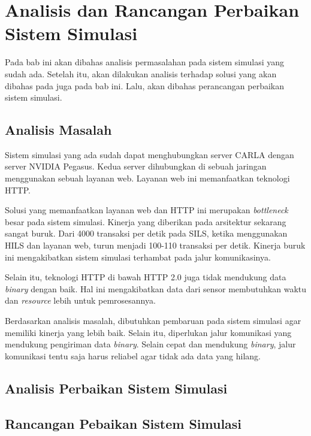 \chapter{Analisis dan Rancangan Perbaikan Sistem Simulasi}

Pada bab ini akan dibahas analisis permasalahan pada sistem simulasi yang sudah
ada. Setelah itu, akan dilakukan analisis terhadap solusi yang akan dibahas pada
juga pada bab ini. Lalu, akan dibahas perancangan perbaikan sistem simulasi.

\section{Analisis Masalah}

Sistem simulasi yang ada sudah dapat menghubungkan server CARLA dengan server
NVIDIA Pegasus. Kedua server dihubungkan di sebuah jaringan menggunakan sebuah
layanan web. Layanan web ini memanfaatkan teknologi HTTP.

Solusi yang memanfaatkan layanan web dan HTTP ini merupakan \textit{bottleneck}
besar pada sistem simulasi. Kinerja yang diberikan pada arsitektur sekarang
sangat buruk. Dari 4000 transaksi per detik pada SILS, ketika menggunakan HILS
dan layanan web, turun menjadi 100-110 transaksi per detik. Kinerja buruk ini
mengakibatkan sistem simulasi terhambat pada jalur komunikasinya.

Selain itu, teknologi HTTP di bawah HTTP 2.0 juga tidak mendukung data
\textit{binary} dengan baik. Hal ini mengakibatkan data dari sensor membutuhkan
waktu dan \textit{resource} lebih untuk pemrosesannya.

Berdasarkan analisis masalah, dibutuhkan pembaruan pada sistem simulasi agar
memiliki kinerja yang lebih baik. Selain itu, diperlukan jalur komunikasi yang
mendukung pengiriman data \textit{binary}. Selain cepat dan mendukung
\textit{binary}, jalur komunikasi tentu saja harus reliabel agar tidak ada data
yang hilang.

\section{Analisis Perbaikan Sistem Simulasi}

\blindtext

\section{Rancangan Pebaikan Sistem Simulasi}

\blindtext